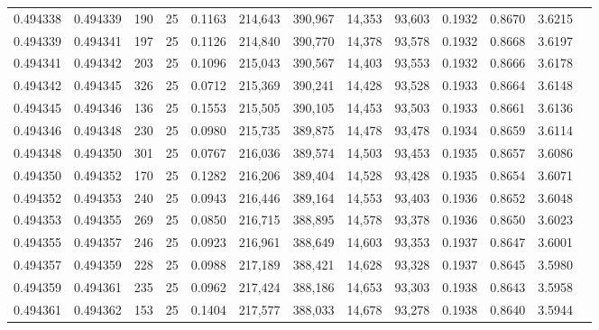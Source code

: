 \begin{tabular}{rrrrrrrrrrrrr}
0.494338 & 0.494339 &   190 &  25 &                                     0.1163 & 214,643 & 390,967 &  14,353 &  93,603 & 0.1932 & 0.8670 & 3.6215 \\
0.494339 & 0.494341 &   197 &  25 &                                     0.1126 & 214,840 & 390,770 &  14,378 &  93,578 & 0.1932 & 0.8668 & 3.6197 \\
0.494341 & 0.494342 &   203 &  25 &                                     0.1096 & 215,043 & 390,567 &  14,403 &  93,553 & 0.1932 & 0.8666 & 3.6178 \\
0.494342 & 0.494345 &   326 &  25 &                                     0.0712 & 215,369 & 390,241 &  14,428 &  93,528 & 0.1933 & 0.8664 & 3.6148 \\
0.494345 & 0.494346 &   136 &  25 &                                     0.1553 & 215,505 & 390,105 &  14,453 &  93,503 & 0.1933 & 0.8661 & 3.6136 \\
0.494346 & 0.494348 &   230 &  25 &                                     0.0980 & 215,735 & 389,875 &  14,478 &  93,478 & 0.1934 & 0.8659 & 3.6114 \\
0.494348 & 0.494350 &   301 &  25 &                                     0.0767 & 216,036 & 389,574 &  14,503 &  93,453 & 0.1935 & 0.8657 & 3.6086 \\
0.494350 & 0.494352 &   170 &  25 &                                     0.1282 & 216,206 & 389,404 &  14,528 &  93,428 & 0.1935 & 0.8654 & 3.6071 \\
0.494352 & 0.494353 &   240 &  25 &                                     0.0943 & 216,446 & 389,164 &  14,553 &  93,403 & 0.1936 & 0.8652 & 3.6048 \\
0.494353 & 0.494355 &   269 &  25 &                                     0.0850 & 216,715 & 388,895 &  14,578 &  93,378 & 0.1936 & 0.8650 & 3.6023 \\
0.494355 & 0.494357 &   246 &  25 &                                     0.0923 & 216,961 & 388,649 &  14,603 &  93,353 & 0.1937 & 0.8647 & 3.6001 \\
0.494357 & 0.494359 &   228 &  25 &                                     0.0988 & 217,189 & 388,421 &  14,628 &  93,328 & 0.1937 & 0.8645 & 3.5980 \\
0.494359 & 0.494361 &   235 &  25 &                                     0.0962 & 217,424 & 388,186 &  14,653 &  93,303 & 0.1938 & 0.8643 & 3.5958 \\
0.494361 & 0.494362 &   153 &  25 &                                     0.1404 & 217,577 & 388,033 &  14,678 &  93,278 & 0.1938 & 0.8640 & 3.5944 \\

\end{tabular}
